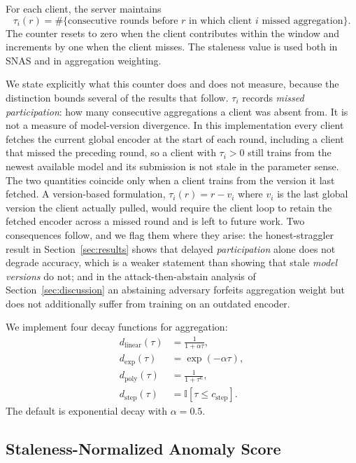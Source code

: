 \documentclass[pdflatex,sn-mathphys-num]{sn-jnl}
\begin{document}
For each client, the server maintains
\begin{equation}
\tau_i(r) = \#\{\text{consecutive rounds before }r\text{ in which client }i\text{ missed aggregation}\}.
\end{equation}
The counter resets to zero when the client contributes within the window and increments by one when the client misses. The staleness value is used both in SNAS and in aggregation weighting.

We state explicitly what this counter does and does not measure, because the distinction bounds several of the results that follow. $\tau_i$ records \emph{missed participation}: how many consecutive aggregations a client was absent from. It is not a measure of model-version divergence. In this implementation every client fetches the current global encoder at the start of each round, including a client that missed the preceding round, so a client with $\tau_i>0$ still trains from the newest available model and its submission is not stale in the parameter sense. The two quantities coincide only when a client trains from the version it last fetched. A version-based formulation, $\tau_i(r)=r-v_i$ where $v_i$ is the last global version the client actually pulled, would require the client loop to retain the fetched encoder across a missed round and is left to future work. Two consequences follow, and we flag them where they arise: the honest-straggler result in Section~\ref{sec:results} shows that delayed \emph{participation} alone does not degrade accuracy, which is a weaker statement than showing that stale \emph{model versions} do not; and in the attack-then-abstain analysis of Section~\ref{sec:discussion} an abstaining adversary forfeits aggregation weight but does not additionally suffer from training on an outdated encoder.

We implement four decay functions for aggregation:
\begin{align}
    d_{\mathrm{linear}}(\tau) &= \frac{1}{1+\alpha\tau}, \\
    d_{\mathrm{exp}}(\tau) &= \exp(-\alpha\tau), \\
    d_{\mathrm{poly}}(\tau) &= \frac{1}{1+\tau^\kappa}, \\
    d_{\mathrm{step}}(\tau) &= \mathbb{I}[\tau \leq c_{\mathrm{step}}].
\end{align}
The default is exponential decay with $\alpha=0.5$.

\subsection{Staleness-Normalized Anomaly Score}
\end{document}

